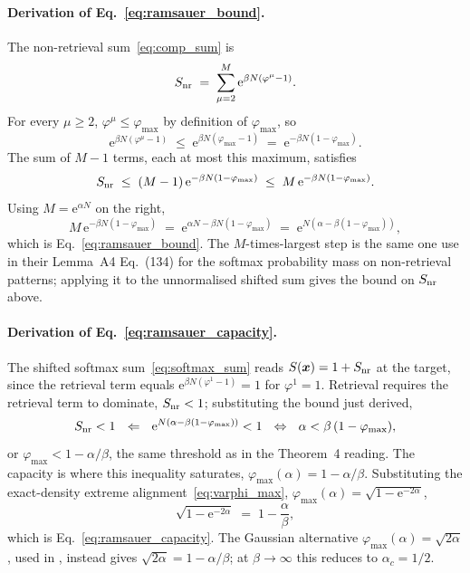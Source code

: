\documentclass[letterpaper]{article} %
\newcommand{\e}{{\mathrm{e}}}
\newcommand{\Bnet}{\beta}
\newcommand{\ac}{\alpha_c}
\begin{document}
\paragraph{Derivation of Eq.~\eqref{eq:ramsauer_bound}.}
The non-retrieval sum~\eqref{eq:comp_sum} is
\begin{equation*}
S_{\rm nr} \;=\; \sum_{\mu = 2}^M \e^{\Bnet N (\varphi^\mu - 1)}.
\end{equation*}
For every $\mu \geq 2$, $\varphi^\mu \leq \varphi_{\max}$ by
definition of $\varphi_{\max}$, so
\begin{equation*}
\e^{\Bnet N (\varphi^\mu - 1)} \;\leq\; \e^{\Bnet N (\varphi_{\max} - 1)}
   \;=\; \e^{-\Bnet N (1-\varphi_{\max})}.
\end{equation*}
The sum of $M - 1$ terms, each at most this maximum, satisfies
\begin{equation*}
S_{\rm nr} \;\leq\; (M-1)\,\e^{-\Bnet N (1-\varphi_{\max})}
   \;\leq\; M\,\e^{-\Bnet N (1-\varphi_{\max})}.
\end{equation*}
Using $M = \e^{\alpha N}$ on the right,
\begin{equation*}
M\,\e^{-\Bnet N (1-\varphi_{\max})}
   \;=\; \e^{\alpha N - \Bnet N (1-\varphi_{\max})}
   \;=\; \e^{N(\alpha - \Bnet(1-\varphi_{\max}))},
\end{equation*}
which is Eq.~\eqref{eq:ramsauer_bound}.  The $M$-times-largest step
is the same one \citeauthor{ramsauer2021hopfield} use in their
Lemma~A4 Eq.~(134) for the softmax probability mass on non-retrieval patterns;
applying it to the unnormalised shifted sum gives the bound on
$S_{\rm nr}$ above.

\paragraph{Derivation of Eq.~\eqref{eq:ramsauer_capacity}.}
The shifted softmax sum~\eqref{eq:softmax_sum} reads
$S(\bm x) = 1 + S_{\rm nr}$ at the target, since the retrieval
term equals $\e^{\Bnet N(\varphi^1 - 1)} = 1$ for $\varphi^1 = 1$.
Retrieval requires the retrieval term to dominate, $S_{\rm nr} < 1$;
substituting the bound just derived,
\begin{equation*}
S_{\rm nr} < 1 \ \ \Leftarrow\ \ 
\e^{N(\alpha - \Bnet(1-\varphi_{\max}))} < 1
\ \ \Leftrightarrow\ \ 
\alpha < \Bnet\,(1-\varphi_{\max}),
\end{equation*}
or $\varphi_{\max} < 1 - \alpha/\Bnet$, the same threshold as in the
Theorem~4 reading.  The capacity is where this inequality saturates,
$\varphi_{\max}(\alpha) = 1 - \alpha/\Bnet$.  Substituting the
exact-density extreme alignment~\eqref{eq:varphi_max},
$\varphi_{\max}(\alpha) = \sqrt{1 - \e^{-2\alpha}}$,
\begin{equation*}
\sqrt{1 - \e^{-2\alpha}} \;=\; 1 - \frac{\alpha}{\Bnet},
\end{equation*}
which is Eq.~\eqref{eq:ramsauer_capacity}.  The Gaussian alternative
$\varphi_{\max}(\alpha) = \sqrt{2\alpha}$, used in
\citet{icml2026theory}, instead gives
$\sqrt{2\alpha} = 1 - \alpha/\Bnet$; at $\Bnet \to \infty$ this
reduces to $\ac = 1/2$.
\end{document}
